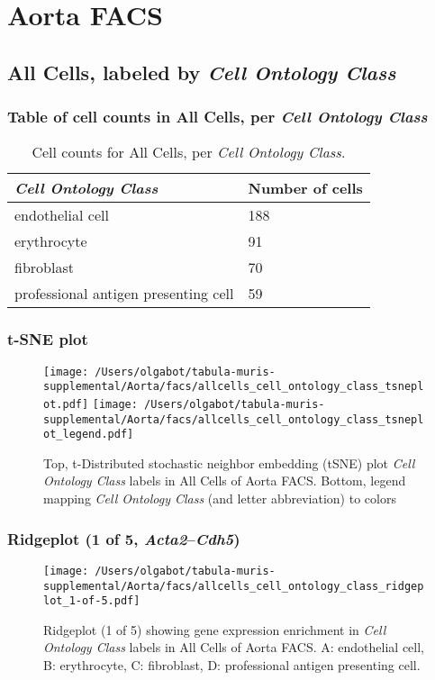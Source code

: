 \clearpage
\section{Aorta FACS}

\subsection{All Cells, labeled by \emph{Cell Ontology Class}}
\subsubsection{Table of cell counts in All Cells, per \emph{Cell Ontology Class}}\begin{table}[h]
\centering
\label{my-label}
\begin{tabular}{@{}ll@{}}
\toprule

\emph{Cell Ontology Class}& Number of cells \\ \midrule
endothelial cell & 188 \\

erythrocyte & 91 \\

fibroblast & 70 \\

professional antigen presenting cell & 59 \\
\bottomrule
\end{tabular}
\caption{Cell counts for All Cells, per \emph{Cell Ontology Class}.}
\end{table}

\clearpage
\subsubsection{t-SNE plot}
\begin{figure}[h]
\centering
\texttt{[image: /Users/olgabot/tabula-muris-supplemental/Aorta/facs/allcells\_cell\_ontology\_class\_tsneplot.pdf]}
\texttt{[image: /Users/olgabot/tabula-muris-supplemental/Aorta/facs/allcells\_cell\_ontology\_class\_tsneplot\_legend.pdf]}
\caption{Top, t-Distributed stochastic neighbor embedding (tSNE) plot  \emph{Cell Ontology Class} labels in All Cells of Aorta FACS. Bottom, legend mapping \emph{Cell Ontology Class} (and letter abbreviation) to colors}
\end{figure}


\clearpage

\subsubsection{Ridgeplot (1 of 5, \emph{Acta2}--\emph{Cdh5})}
\begin{figure}[h]
\centering
\texttt{[image: /Users/olgabot/tabula-muris-supplemental/Aorta/facs/allcells\_cell\_ontology\_class\_ridgeplot\_1-of-5.pdf]}

\caption{ Ridgeplot (1 of 5)  showing gene expression enrichment in \emph{Cell Ontology Class} labels in All Cells of Aorta FACS. A: endothelial cell, B: erythrocyte, C: fibroblast, D: professional antigen presenting cell.}
\end{figure}



